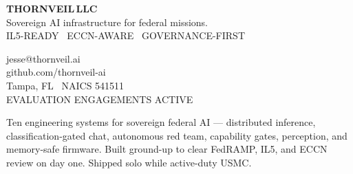\documentclass[10pt,letterpaper]{article}
\begin{document}
\begin{tcolorbox}[enhanced,sharp corners,boxrule=0pt,frame hidden,
  colback=navy,left=14pt,right=14pt,top=11pt,bottom=11pt,before skip=0pt,after skip=8pt]
\color{white}
\begin{minipage}[c]{0.60\textwidth}
  {\fontsize{25}{27}\selectfont\bfseries THORNVEIL\,\textcolor{teal!85!white}{LLC}}\\[3pt]
  {\plexlight\fontsize{10.5}{12}\selectfont Sovereign AI infrastructure for federal missions.}\\[1pt]
  {\plexmono\scriptsize\color{teal!70!white}IL5-READY \textbullet\ ECCN-AWARE \textbullet\ GOVERNANCE-FIRST}
\end{minipage}\hfill
\begin{minipage}[c]{0.37\textwidth}\raggedleft
  {\plexmono\scriptsize\color{white}%
   jesse@thornveil.ai\\[2pt]
   github.com/thornveil-ai\\[2pt]
   Tampa, FL \textbullet\ NAICS 541511\\[2pt]
   \color{teal!70!white}EVALUATION ENGAGEMENTS ACTIVE}
\end{minipage}
\end{tcolorbox}

{\color{mute}\small Ten engineering systems for sovereign federal AI — distributed inference, classification-gated chat,
autonomous red team, capability gates, perception, and memory-safe firmware. Built ground-up to clear
FedRAMP, IL5, and ECCN review on day one. Shipped solo while active-duty USMC.}\vspace{2pt}
\end{document}
